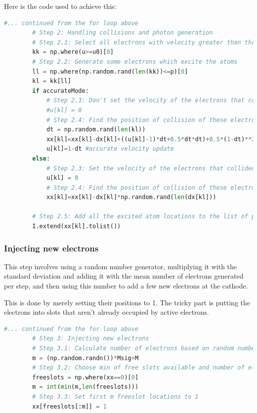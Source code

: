 \documentclass[12pt]{article}
\begin{document}
Here is the code used to achieve this:
\begin{lstlisting}[language=Python]
        #... continued from the for loop above
        # Step 2: Handling collisions and photon generation
        # Step 2.1: Select all electrons with velocity greater than threshold velocity
        kk = np.where(u>=u0)[0]
        # Step 2.2: Generate some electrons which excite the atoms
        ll = np.where(np.random.rand(len(kk))<=p)[0]
        kl = kk[ll]
        if accurateMode:
            # Step 2.3: Don't set the velocity of the electrons that collided to 0
            #u[kl] = 0
            # Step 2.4: Find the position of collision of these electrons
            dt = np.random.rand(len(kl))
            xx[kl]=xx[kl]-dx[kl]+((u[kl]-1)*dt+0.5*dt*dt)+0.5*(1-dt)**2 #accurate collision location
            u[kl]=1-dt #accurate velocity update
        else:
            # Step 2.3: Set the velocity of the electrons that collided to 0
            u[kl] = 0
            # Step 2.4: Find the position of collision of these electrons
            xx[kl]=xx[kl]-dx[kl]*np.random.rand(len(dx[kl]))
        
        # Step 2.5: Add all the excited atom locations to the list of photon positions
        I.extend(xx[kl].tolist())

\end{lstlisting}
\pagebreak
\subsubsection{Injecting new electrons}

This step involves using a random number generator, multiplying it with the standard deviation and adding it with the mean number of electrons generated per step, and then using this number to add a few new electrons at the cathode.

This is done by merely setting their positions to 1. The tricky part is putting the electrons into slots that aren't already occupied by active electrons.

\begin{lstlisting}[language=Python]
        #... continued from the for loop above
        # Step 3: Injecting new electrons
        # Step 3.1: Calculate number of electrons based on random number generator
        m = (np.random.randn())*Msig+M
        # Step 3.2: Choose min of free slots available and number of electrons from above
        freeslots = np.where(xx==0)[0]
        m = int(min(m,len(freeslots)))
        # Step 3.3: Set first m freeslot locations to 1
        xx[freeslots[:m]] = 1
\end{lstlisting}
\end{document}
